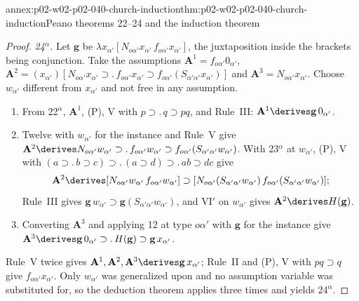 \begin{annexitem}{annex:p02-w02-p02-040-church-induction}{thm:p02-w02-p02-040-church-induction}{Peano theorems 22--24 and the induction theorem}
\begin{proof}
\emph{24\(^\alpha\).}  Let \(\mathbf g\) be
\(\lambda x_{\alpha'}[N_{o\alpha'}x_{\alpha'}\,f_{o\alpha'}x_{\alpha'}]\), the
juxtaposition inside the brackets being conjunction.  Take the assumptions
\(\mathbf A^1=f_{o\alpha'}0_{\alpha'}\),
\(\mathbf A^2=(x_{\alpha'})[N_{o\alpha'}x_{\alpha'}\supset.\,f_{o\alpha'}x_{\alpha'}\supset f_{o\alpha'}(S_{\alpha'\alpha'}x_{\alpha'})]\)
and \(\mathbf A^3=N_{o\alpha'}x_{\alpha'}\).  Choose \(w_{\alpha'}\) different
from \(x_{\alpha'}\) and not free in any assumption.
\begin{enumerate}
 \item From 22\(^\alpha\), \(\mathbf A^1\), (P), V with
   \(p\supset.\,q\supset pq\), and Rule~III:
   \(\mathbf A^1\derives\mathbf g\,0_{\alpha'}\).
 \item Twelve with \(w_{\alpha'}\) for the instance and Rule~V give
   \(\mathbf A^2\derives N_{o\alpha'}w_{\alpha'}\supset.\,f_{o\alpha'}w_{\alpha'}\supset f_{o\alpha'}(S_{\alpha'\alpha'}w_{\alpha'})\).
   With 23\(^\alpha\) at \(w_{\alpha'}\), (P), V with
   \((a\supset.\,b\supset c)\supset.\,(a\supset d)\supset.\,ab\supset dc\) give
   \[
    \mathbf A^2\derives[N_{o\alpha'}w_{\alpha'}\,f_{o\alpha'}w_{\alpha'}]\supset
    [N_{o\alpha'}(S_{\alpha'\alpha'}w_{\alpha'})\,f_{o\alpha'}(S_{\alpha'\alpha'}w_{\alpha'})];
   \]
   Rule~III gives \(\mathbf g\,w_{\alpha'}\supset\mathbf g(S_{\alpha'\alpha'}w_{\alpha'})\),
   and VI\('\) on \(w_{\alpha'}\) gives \(\mathbf A^2\derives H(\mathbf g)\).
 \item Converting \(\mathbf A^3\) and applying 12 at type \(o\alpha'\) with
   \(\mathbf g\) for the instance give
   \(\mathbf A^3\derives\mathbf g\,0_{\alpha'}\supset.\,H(\mathbf g)\supset\mathbf g\,x_{\alpha'}\).
\end{enumerate}
Rule~V twice gives \(\mathbf A^1,\mathbf A^2,\mathbf A^3\derives\mathbf g\,x_{\alpha'}\);
Rule~II and (P), V with \(pq\supset q\) give
\(f_{o\alpha'}x_{\alpha'}\).  Only \(w_{\alpha'}\) was generalized upon and
no assumption variable was substituted for, so the deduction theorem applies
three times and yields 24\(^\alpha\).


\end{proof}
\end{annexitem}
